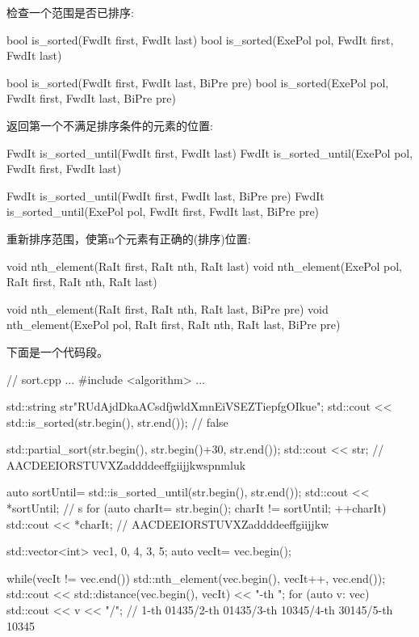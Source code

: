 检查一个范围是否已排序:

\begin{cpp}
bool is_sorted(FwdIt first, FwdIt last)
bool is_sorted(ExePol pol, FwdIt first, FwdIt last)

bool is_sorted(FwdIt first, FwdIt last, BiPre pre)
bool is_sorted(ExePol pol, FwdIt first, FwdIt last, BiPre pre)
\end{cpp}

返回第一个不满足排序条件的元素的位置:

\begin{cpp}
FwdIt is_sorted_until(FwdIt first, FwdIt last)
FwdIt is_sorted_until(ExePol pol, FwdIt first, FwdIt last)

FwdIt is_sorted_until(FwdIt first, FwdIt last, BiPre pre)
FwdIt is_sorted_until(ExePol pol, FwdIt first, FwdIt last, BiPre pre)
\end{cpp}

重新排序范围，使第n个元素有正确的(排序)位置:

\begin{cpp}
void nth_element(RaIt first, RaIt nth, RaIt last)
void nth_element(ExePol pol, RaIt first, RaIt nth, RaIt last)

void nth_element(RaIt first, RaIt nth, RaIt last, BiPre pre)
void nth_element(ExePol pol, RaIt first, RaIt nth, RaIt last, BiPre pre)
\end{cpp}

下面是一个代码段。


\begin{cpp}
// sort.cpp
...
#include <algorithm>
...

std::string str{"RUdAjdDkaACsdfjwldXmnEiVSEZTiepfgOIkue"};
std::cout << std::is_sorted(str.begin(), str.end()); // false

std::partial_sort(str.begin(), str.begin()+30, str.end());
std::cout << str; // AACDEEIORSTUVXZaddddeeffgiijjkwspnmluk

auto sortUntil= std::is_sorted_until(str.begin(), str.end());
std::cout << *sortUntil; // s
for (auto charIt= str.begin(); charIt != sortUntil; ++charIt)
	std::cout << *charIt; // AACDEEIORSTUVXZaddddeeffgiijjkw

std::vector<int> vec{1, 0, 4, 3, 5};
auto vecIt= vec.begin();

while(vecIt != vec.end()){
	std::nth_element(vec.begin(), vecIt++, vec.end());
	std::cout << std::distance(vec.begin(), vecIt) << "-th ";
	for (auto v: vec) std::cout << v << "/";
}
// 1-th 01435/2-th 01435/3-th 10345/4-th 30145/5-th 10345
\end{cpp}












